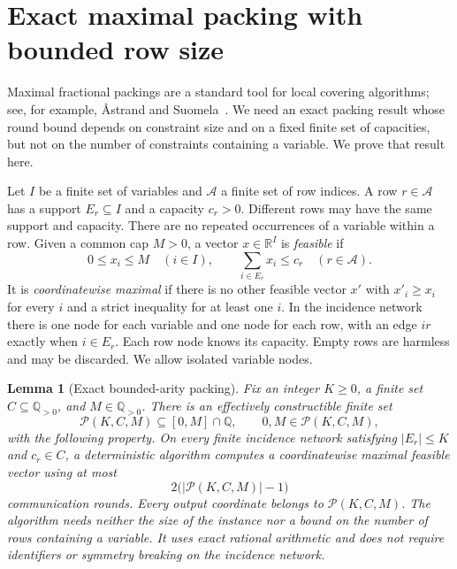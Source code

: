 \documentclass[11pt,a4paper]{article}
\newtheorem{lemma}[lemma]{Lemma}
\theoremstyle{definition}
\theoremstyle{remark}
\begin{document}
\section{Exact maximal packing with bounded row size}
\label{sec:packing}

Maximal fractional packings are a standard tool for local covering
algorithms; see, for example, \AA strand and Suomela~\cite{AS10}.
We need an exact packing result whose round bound depends on constraint
size and on a fixed finite set of capacities, but not on the number of
constraints containing a variable.  We prove that result here.

Let $I$ be a finite set of variables and $\mathcal A$ a finite set of row
indices.  A row $r\in\mathcal A$ has a support $E_r\subseteq I$ and a
capacity $c_r>0$.  Different rows may have the same support and capacity.
There are no repeated occurrences of a variable within a row.  Given a
common cap $M>0$, a vector $x\in\mathbb R^I$ is \emph{feasible} if
\begin{equation}\label{pack:feasible}
 0\leq x_i\leq M\quad(i\in I),
 \qquad \sum_{i\in E_r}x_i\leq c_r\quad(r\in\mathcal A).
\end{equation}
It is \emph{coordinatewise maximal} if there is no other feasible vector
$x'$ with $x'_i\geq x_i$ for every $i$ and a strict inequality for at least
one $i$.  In the incidence network there is one node for each variable and
one node for each row, with an edge $ir$ exactly when $i\in E_r$.
Each row node knows its capacity.  Empty rows are harmless and may be
discarded.  We allow isolated variable nodes.

\begin{lemma}[Exact bounded-arity packing]\label{pack:theorem}
Fix an integer $K\geq0$, a finite set $C\subseteq\mathbb Q_{>0}$, and
$M\in\mathbb Q_{>0}$.  There is an effectively constructible finite set
\[
 \mathcal P(K,C,M)\subseteq[0,M]\cap\mathbb Q,
 \qquad 0,M\in\mathcal P(K,C,M),
\]
with the following property.  On every finite incidence network satisfying
$|E_r|\leq K$ and $c_r\in C$, a deterministic algorithm computes a
coordinatewise maximal feasible vector using at most
\[
 2\bigl(|\mathcal P(K,C,M)|-1\bigr)
\]
communication rounds.  Every output coordinate
belongs to $\mathcal P(K,C,M)$.  The algorithm needs neither the size of
the instance nor a bound on the number of rows containing a variable.
It uses exact rational arithmetic and does not require identifiers or
symmetry breaking on the incidence network.
\end{lemma}
\end{document}
